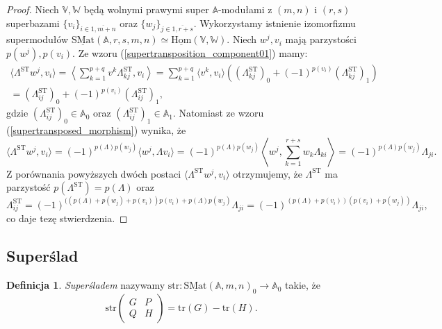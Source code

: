 \documentclass[11pt,a4paper]{report}
\theoremstyle{definition}
\newtheorem{definition}[theorem]{Definicja}
\newcommand{\tr}{\mathrm{tr}}
\newcommand{\str}{\mathrm{str}}
\begin{document}
\begin{proof}
Niech $\mathbb{V},\mathbb{W}$ będą wolnymi prawymi super $\mathbb{A}$-modułami z $(m,n)$ i $(r,s)$ superbazami $\{ v_i \}_{i \in \overline{1,m+n}}$ oraz $\{ w_j \}_{j\in \overline{1,r+s}}$. Wykorzystamy istnienie izomorfizmu supermodułów $\underline{\mathrm{SMat}}(\mathbb{A},r,s,m,n) \simeq \underline{\mathrm{Hom}}(\mathbb{V}, \mathbb{W})$. Niech $w^j, v_i$ mają parzystości $p(w^j), p(v_i)$. Ze wzoru (\ref{supertransposition_component01}) mamy:
 \begin{equation*}
 \begin{gathered}
    \langle \Lambda^{\mathrm{ST}} w^j, v_i \rangle = \left\langle \sum_{k=1}^{p+q} v^k \Lambda^{\mathrm{ST}}_{kj}, v_i \right\rangle = \sum_{k=1}^{p+q} \langle v^k, v_i \rangle \left( \left( \Lambda^{\mathrm{ST}}_{kj} \right)_0 + (-1)^{p(v_i)}\left( \Lambda^{\mathrm{ST}}_{kj} \right)_1 \right) 
    \\ = \left( \Lambda^{\mathrm{ST}}_{ij} \right)_0 + (-1)^{p(v_i)} \left( \Lambda^{\mathrm{ST}}_{ij} \right)_1\!,
 \end{gathered}
 \end{equation*}
 gdzie $\left( \Lambda^{\mathrm{ST}}_{ij} \right)_0 \in \mathbb{A}_0$ oraz $\left( \Lambda^{\mathrm{ST}}_{ij} \right)_1 \in \mathbb{A}_1$. Natomiast ze wzoru (\ref{supertransposed_morphism}) wynika, że
 \begin{equation*}
      \langle \Lambda^{\mathrm{ST}} w^j, v_i\rangle = (-1)^{p(\Lambda)p(w_j)} \langle w^j, \Lambda v_i \rangle = (-1)^{p(\Lambda)p(w_j)} \left\langle w^j, \sum_{k=1}^{r+s} w_k \Lambda_{ki} \right\rangle = (-1)^{p(\Lambda)p(w_j)} \Lambda_{ji}.
 \end{equation*}
 Z porównania powyższych dwóch postaci $\langle \Lambda^{\mathrm{ST}} w^j, v_i \rangle$ otrzymujemy, że $\Lambda^{\mathrm{ST}}$ ma parzystość $p(\Lambda^{\mathrm{ST}}) = p(\Lambda)$ oraz
 \begin{equation*}
  \Lambda^{\mathrm{ST}}_{ij} = (-1)^{((p(\Lambda) + p(w_j) + p(v_i))p(v_i) + p(\Lambda)p(w_j)} \Lambda_{ji} = (-1)^{(p(\Lambda)+p(v_i))(p(v_i)+p(w_j))} \Lambda_{ji},
 \end{equation*}
 co daje tezę stwierdzenia.
\end{proof}

\subsection{Superślad}

\begin{definition}
\textit{Superśladem} nazywamy $\str: \underline{\mathrm{SMat}}(\mathbb{A},m,n)_0 \rightarrow \mathbb{A}_0$ takie, że $$\str \left( \begin{matrix}
      G & P \\
      Q & H
     \end{matrix} \right) = \tr(G) - \tr(H).$$
\end{definition}
\end{document}

